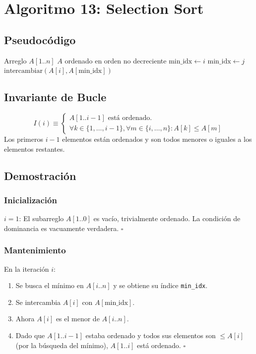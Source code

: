 \documentclass[11pt,a4paper]{article}
\newcommand{\inv}{I}
\begin{document}
\newpage

\section{Algoritmo 13: Selection Sort}

\subsection{Pseudocódigo}
\begin{algorithm}[H]
\caption{Selection Sort}
\begin{algorithmic}[1]
\Require Arreglo $A[1..n]$
\Ensure $A$ ordenado en orden no decreciente
    \State $\text{min\_idx} \gets i$
            \State $\text{min\_idx} \gets j$
        \EndIf
    \EndFor
    \State $\text{intercambiar}(A[i], A[\text{min\_idx}])$
\EndFor
\end{algorithmic}
\end{algorithm}

\subsection{Invariante de Bucle}
\[
\boxed{\inv(i) \equiv \begin{cases}
A[1..i-1] \text{ está ordenado.}\\
\forall k \in \{1, \ldots, i-1\}, \forall m \in \{i, \ldots, n\}: A[k] \leq A[m]
\end{cases}}
\]
Los primeros $i-1$ elementos están ordenados y son todos menores o iguales a los elementos restantes.

\subsection{Demostración}

\subsubsection{Inicialización}
$i = 1$: El subarreglo $A[1..0]$ es vacío, trivialmente ordenado. La condición de dominancia es vacuamente verdadera. $\square$

\subsubsection{Mantenimiento}
En la iteración $i$:
\begin{enumerate}
    \item Se busca el mínimo en $A[i..n]$ y se obtiene su índice \texttt{min\_idx}.
    \item Se intercambia $A[i]$ con $A[\text{min\_idx}]$.
    \item Ahora $A[i]$ es el menor de $A[i..n]$.
    \item Dado que $A[1..i-1]$ estaba ordenado y todos sus elementos son $\leq A[i]$ (por la búsqueda del mínimo), $A[1..i]$ está ordenado. $\square$
\end{enumerate}
\end{document}
